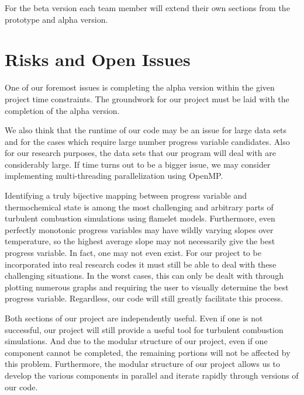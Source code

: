 \documentclass[11pt]{article}
\begin{document}
For the beta version each team member will extend their own sections from the prototype and alpha version. 


\section{Risks and Open Issues}
One of our foremost issues is completing the alpha version within the given project time constraints. The groundwork for our project must be laid with the completion of the alpha version. 

We also think that the runtime of our code may be an issue for large data sets and for the cases which require large number progress variable candidates. Also for our research purposes, the data sets that our program will deal with are considerably large. If time turns out to be a bigger issue, we may consider implementing multi-threading parallelization using OpenMP.

Identifying a truly bijective mapping between progress variable and thermochemical state is among the most challenging and arbitrary parts of turbulent combustion simulations using flamelet models. Furthermore, even perfectly monotonic progress variables may have wildly varying slopes over temperature, so the highest average slope may not necessarily give the best progress variable. In fact, one may not even exist. For our project to be incorporated into real research codes it must still be able to deal with these challenging situations. In the worst cases, this can only be dealt with through plotting numerous graphs and requiring the user to visually determine the best progress variable. Regardless, our code will still greatly facilitate this process.

Both sections of our project are independently useful. Even if one is not successful, our project will still provide a useful tool for turbulent combustion simulations. And due to the modular structure of our project, even if one component cannot be completed, the remaining portions will not be affected by this problem. Furthermore, the modular structure of our project allows us to develop the various components in parallel and iterate rapidly through versions of our code. 

\end{document}
